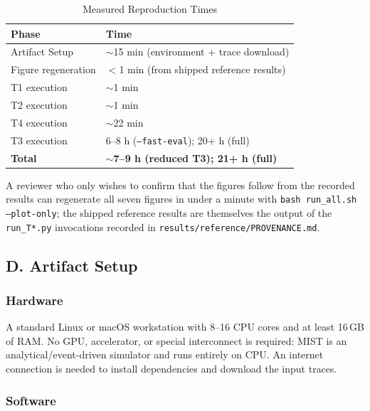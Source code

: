 \documentclass[conference]{IEEEtran}
\newcommand{\tool}{{MIST }}
\begin{document}
\begin{table}[!th]
\centering
\caption{Measured Reproduction Times}
\label{tab:times}
\begin{tabular}{@{}lp{4.6cm}@{}}
\toprule
\textbf{Phase} & \textbf{Time} \\
\midrule
Artifact Setup      & $\sim$15 min (environment + trace download) \\
Figure regeneration & $<$1 min (from shipped reference results) \\
\addlinespace
T1 execution        & $\sim$1 min \\
T2 execution        & $\sim$1 min \\
T4 execution        & $\sim$22 min \\
T3 execution        & 6--8 h (\texttt{--fast-eval}); 20+ h (full) \\
\midrule
\textbf{Total}      & \textbf{$\sim$7--9 h (reduced T3); 21+ h (full)} \\
\bottomrule
\end{tabular}
\end{table}

\noindent A reviewer who only wishes to confirm that the figures follow
from the recorded results can regenerate all seven figures in under a
minute with \texttt{bash run\_all.sh --plot-only}; the shipped reference
results are themselves the output of the \texttt{run\_T*.py} invocations
recorded in \texttt{results/reference/PROVENANCE.md}.

\subsection*{D. Artifact Setup}

\subsubsection*{Hardware}

A standard Linux or macOS workstation with 8--16 CPU cores and at least
16\,GB of RAM.  No GPU, accelerator, or special interconnect is required:
\tool is an analytical/event-driven simulator and runs entirely on CPU.
An internet connection is needed to install dependencies and download
the input traces.

\subsubsection*{Software}
\end{document}
